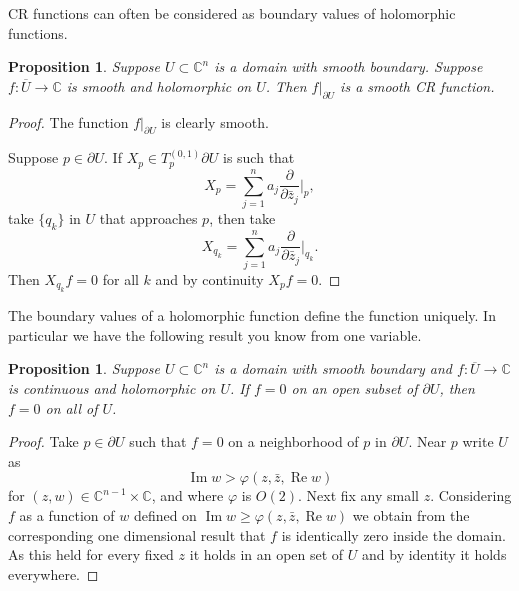 \documentclass[12pt,openany]{book}
\renewcommand{\Re}{\operatorname{Re}}
\renewcommand{\Im}{\operatorname{Im}}
\newcommand{\C}{{\mathbb{C}}}
\theoremstyle{plain}
\newtheorem{prop}[thm]{Proposition}
\theoremstyle{remark}
\theoremstyle{definition}
\theoremstyle{exercise}
\theoremstyle{example}
\begin{document}
CR functions can often be considered as boundary values of
holomorphic functions.

\begin{prop}
Suppose $U \subset \C^n$ is a domain with smooth boundary.  Suppose
$f \colon \overline{U} \to \C$ is smooth and holomorphic on $U$.
Then $f|_{\partial U}$ is a smooth CR function.
\end{prop}

\begin{proof}
The function $f|_{\partial U}$ is clearly smooth.

Suppose $p \in \partial U$.
If $X_p \in T_p^{(0,1)} \partial U$ is such that
\begin{equation*}
X_p = \sum_{j=1}^n a_j \frac{\partial}{\partial \bar{z}_j} \Big|_p ,
\end{equation*}
take $\{ q_k \}$ in $U$ that approaches $p$, then take
\begin{equation*}
X_{q_k} = \sum_{j=1}^n a_j \frac{\partial}{\partial \bar{z}_j} \Big|_{q_k} .
\end{equation*}
Then $X_{q_k} f = 0$ for all $k$ and by continuity $X_p f = 0$.
\end{proof}

The boundary values of a holomorphic function define the function uniquely.  In
particular we have the following result you know from one variable.

\begin{prop}
Suppose $U \subset \C^n$ is a domain with smooth boundary and $f \colon \overline{U} \to \C$ is 
continuous and holomorphic on $U$.  If $f=0$ on an open subset of $\partial
U$, then $f=0$ on all of $U$.
\end{prop}

\begin{proof}
Take $p \in \partial U$ such that $f=0$ on a neighborhood of $p$ in
$\partial U$.  Near $p$ write $U$ as
\begin{equation*}
\Im w > \varphi(z,\bar{z},\Re w)
\end{equation*}
for $(z,w) \in \C^{n-1} \times \C$, and where $\varphi$ is $O(2)$.
Next fix any small $z$.  Considering $f$ as a function of $w$
defined on
$\Im w \geq \varphi(z,\bar{z},\Re w)$ we obtain from the corresponding
one dimensional result that $f$ is identically zero inside the domain.
As this held for every fixed $z$ it holds in an open set of $U$ and by
identity it holds everywhere.
\end{proof}
\end{document}
